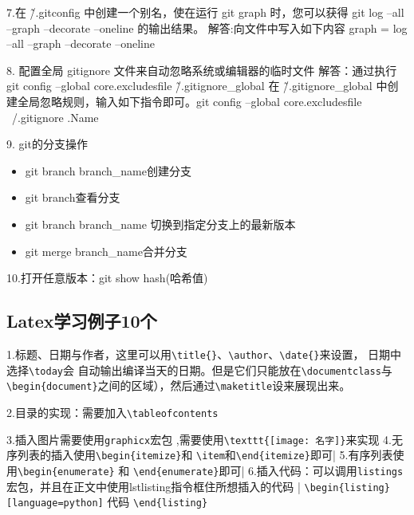 \documentclass{article}
\begin{document}
7.在 \~/.gitconfig 中创建一个别名，使在运行 git graph 时，您可以获得 git log –all –graph –decorate –oneline 的输出结果。\newline
解答:向文件中写入如下内容\newline
[alias]\newline
    graph = log --all --graph --decorate --oneline\newline
\newline

8.
配置全局 gitignore 文件来自动忽略系统或编辑器的临时文件 \newline
解答：通过执行 git config –global core.excludesfile \~/.gitignore\_global 在 \~/.gitignore\_global 中创建全局忽略规则，输入如下指令即可。git config --global core.excludesfile ~/.gitignore .Name

9.
git的分支操作

\begin{itemize}
    \item git branch branch\_name创建分支
    \item git branch查看分支
    \item git branch branch\_name  切换到指定分支上的最新版本
    \item git merge branch\_name合并分支


\end{itemize}
10.打开任意版本：git show hash(哈希值)

\subsection{Latex学习例子10个}
1.标题、日期与作者，这里可以用\verb|\title{}|、\verb|\author|、\verb|\date{}|来设置， 日期中选择\verb|\today|会 自动输出编译当天的日期。但是它们只能放在\verb|\documentclass|与\verb|\begin{document}|之间的区域），然后通过\verb|\maketitle|设来展现出来。

 
2.目录的实现：需要加入\verb|\tableofcontents|

3.插入图片需要使用\verb|graphicx|宏包 ,需要使用\verb|\texttt{[image: 名字]}|来实现\newline
4.无序列表的插入使用\verb|\begin{itemize}|和
\verb|\item|和\verb|\end{itemize}|即可|\newline
5.有序列表使用\verb|\begin{enumerate}| 和
\verb|\end{enumerate}|即可|\newline
6.插入代码：可以调用\verb|listings|宏包，并且在正文中使用lstlisting指令框住所想插入的代码 |\newline
\verb|\begin{listing}[language=python]|\newline
代码\newline
\verb|\end{listing}|\newline
\end{document}

